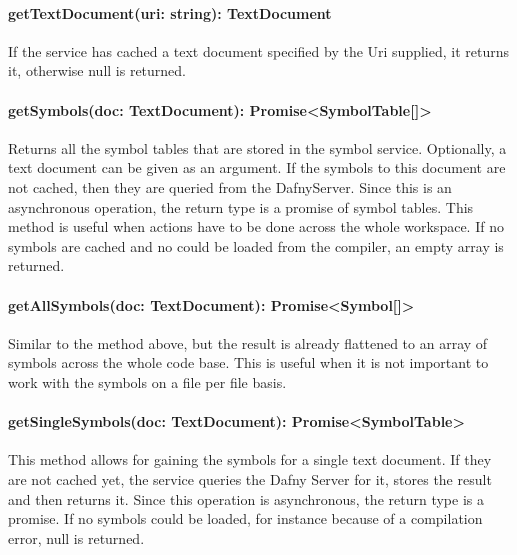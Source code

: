 \paragraph{getTextDocument(uri: string): TextDocument} If the service has cached a text document specified by the Uri supplied, it returns it, otherwise null is returned.
\paragraph{getSymbols(doc: TextDocument): Promise<SymbolTable[]>} Returns all the symbol tables that are stored in the symbol service. Optionally, a text document can be given as an argument. If the symbols to this document are not cached, then they are queried from the DafnyServer. Since this is an asynchronous operation, the return type is a promise of symbol tables. This method is useful when actions have to be done across the whole workspace. If no symbols are cached and no could be loaded from the compiler, an empty array is returned.
\paragraph{getAllSymbols(doc: TextDocument): Promise<Symbol[]>} Similar to the method above, but the result is already flattened to an array of symbols across the whole code base. This is useful when it is not important to work with the symbols on a file per file basis.
\paragraph{getSingleSymbols(doc: TextDocument): Promise<SymbolTable>} This method allows for gaining the symbols for a single text document. If they are not cached yet, the service queries the Dafny Server for it, stores the result and then returns it. Since this operation is asynchronous, the return type is a promise. If no symbols could be loaded, for instance because of a compilation error, null is returned.
